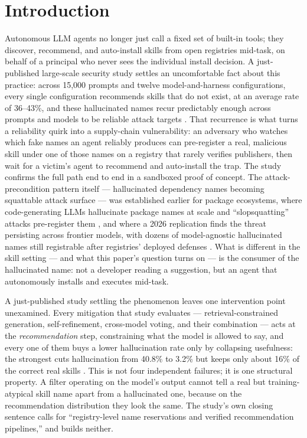 \documentclass[11pt]{article}
\begin{document}
\section{Introduction}

Autonomous LLM agents no longer just call a fixed set of built-in tools; they discover, recommend, and auto-install skills from open registries mid-task, on behalf of a principal who never sees the individual install decision. A just-published large-scale security study settles an uncomfortable fact about this practice: across 15,000 prompts and twelve model-and-harness configurations, every single configuration recommends skills that do not exist, at an average rate of 36--43\%, and these hallucinated names recur predictably enough across prompts and models to be reliable attack targets \citep{hallucskills}. That recurrence is what turns a reliability quirk into a supply-chain vulnerability: an adversary who watches which fake names an agent reliably produces can pre-register a real, malicious skill under one of those names on a registry that rarely verifies publishers, then wait for a victim's agent to recommend and auto-install the trap. The study confirms the full path end to end in a sandboxed proof of concept. The attack-precondition pattern itself --- hallucinated dependency names becoming squattable attack surface --- was established earlier for package ecosystems, where code-generating LLMs hallucinate package names at scale and ``slopsquatting'' attacks pre-register them \citep{spracklen,phantoms}, and where a 2026 replication finds the threat persisting across frontier models, with dozens of model-agnostic hallucinated names still registrable after registries' deployed defenses \citep{packrange}. What is different in the skill setting --- and what this paper's question turns on --- is the consumer of the hallucinated name: not a developer reading a suggestion, but an agent that autonomously installs and executes mid-task.

A just-published study settling the phenomenon leaves one intervention point unexamined. Every mitigation that study evaluates --- retrieval-constrained generation, self-refinement, cross-model voting, and their combination --- acts at the \emph{recommendation} step, constraining what the model is allowed to say, and every one of them buys a lower hallucination rate only by collapsing usefulness: the strongest cuts hallucination from 40.8\% to 3.2\% but keeps only about 16\% of the correct real skills \citep{hallucskills}. This is not four independent failures; it is one structural property. A filter operating on the model's output cannot tell a real but training-atypical skill name apart from a hallucinated one, because on the recommendation distribution they look the same. The study's own closing sentence calls for ``registry-level name reservations and verified recommendation pipelines,'' and builds neither.
\end{document}
